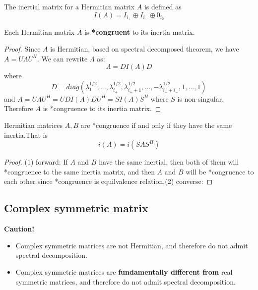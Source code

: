 \begin{refsection}
\begin{definition}\cite[282]{horn2012matrix}
The inertial matrix for a Hermitian matrix $A$ is defined as
$$I(A) = I_{i_+}\oplus I_{i_-} \oplus 0_{i_0}$$
\end{definition}


\begin{lemma}
Each Hermitian matrix $A$ is \textbf{*congruent} to its inertia matrix.
\end{lemma}
\begin{proof}
Since $A$ is Hermitian, based on spectral decomposed theorem, we have
$A = U\Lambda U^H$. 
We can rewrite $\Lambda$ as:
$$\Lambda = DI(A)D$$
where $$D=diag(\lambda_1^{1/2},...,\lambda_{i_+}^{1/2},\lambda_{i_+ + 1}^{1/2},...,-\lambda_{i_+ + i_-}^{1/2},1,...,1)$$
and 
$A = U\Lambda U^H = UDI(A)DU^H = SI(A)S^H$ where $S$ is non-singular. Therefore $A$ is *congruence to its inertia matrix.
\end{proof}


\begin{theorem}\cite[282]{horn2012matrix}\label{ch:linearalgebra:th:Sylvesterinertiatheorem}
Hermitian matrices $A,B$ are *congruence if and only if they have the same inertia.That is
$$i(A) = i(SAS^H)$$
\end{theorem}
\begin{proof}
(1) forward: If $A$ and $B$ have the same inertial, then both of them will *congruence to the same inertia matrix, and then $A$ and $B$ will be *congruence to each other since *congruence is equilvalence relation.(2) converse: 
\end{proof}

















\subsection{Complex symmetric matrix}
\begin{mdframed}
\textbf{Caution!}\\
\begin{itemize}
    \item Complex symmetric matrices are not Hermitian, and therefore do not admit spectral decomposition.
    \item Complex symmetric matrices are \textbf{fundamentally different from} real symmetric matrices, and therefore do not admit spectral decomposition.
\end{itemize}



\end{mdframed}
\end{refsection}
